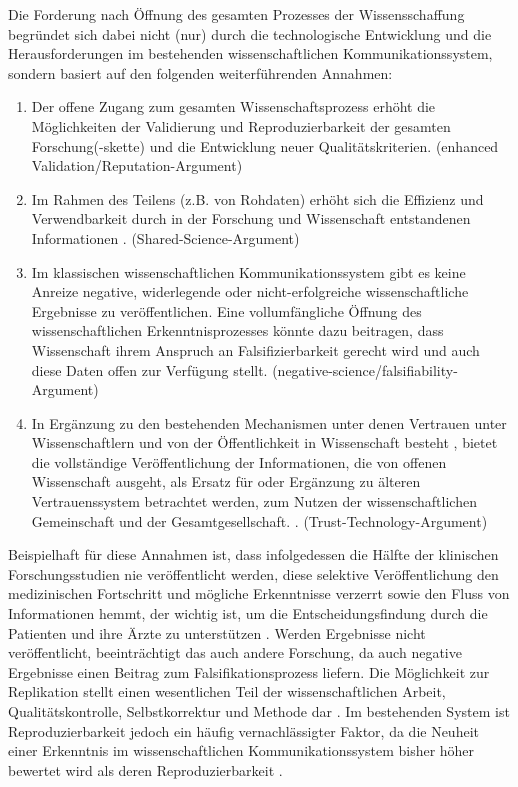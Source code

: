 Die Forderung nach Öffnung des gesamten Prozesses der Wissensschaffung begründet sich dabei nicht (nur) durch die technologische Entwicklung und die Herausforderungen im bestehenden wissenschaftlichen Kommunikationssystem, sondern basiert auf den folgenden weiterführenden Annahmen:
\begin{enumerate}
\item Der offene Zugang zum gesamten Wissenschaftsprozess erhöht die Möglichkeiten der Validierung und Reproduzierbarkeit der gesamten Forschung(-skette) \cite{Nosek_2015} \cite{Aleksic_2014} \cite{Krumholz_2014} \cite{hey_2015_open} und die Entwicklung neuer Qualitätskriterien. (enhanced Validation/Reputation-Argument)
\item Im Rahmen des Teilens (z.B. von Rohdaten) erhöht sich die Effizienz und Verwendbarkeit durch in der Forschung und Wissenschaft entstandenen Informationen \cite{Fecher_2015}. (Shared-Science-Argument)
\item Im klassischen wissenschaftlichen Kommunikationssystem gibt es keine Anreize negative, widerlegende oder nicht-erfolgreiche wissenschaftliche Ergebnisse zu veröffentlichen. Eine vollumfängliche Öffnung des wissenschaftlichen Erkenntnisprozesses könnte dazu beitragen, dass Wissenschaft ihrem Anspruch an Falsifizierbarkeit gerecht wird und auch diese Daten offen zur Verfügung stellt. (negative-science/falsifiability-Argument)
\item In Ergänzung zu den bestehenden Mechanismen unter denen Vertrauen unter Wissenschaftlern und von der Öffentlichkeit in Wissenschaft besteht \cite{weingart_2005_wissenschaft}, bietet die vollständige Veröffentlichung der Informationen, die von offenen Wissenschaft ausgeht, als Ersatz für oder Ergänzung zu älteren Vertrauenssystem betrachtet werden, zum Nutzen der wissenschaftlichen Gemeinschaft und der Gesamtgesellschaft. \cite{grand_2012_open}. (Trust-Technology-Argument)
\end{enumerate}

Beispielhaft für diese Annahmen ist, dass infolgedessen die Hälfte der klinischen Forschungsstudien nie veröffentlicht werden, diese selektive Veröffentlichung den medizinischen Fortschritt und mögliche Erkenntnisse verzerrt sowie den Fluss von Informationen hemmt, der wichtig ist, um die Entscheidungsfindung durch die Patienten und ihre Ärzte zu unterstützen \cite{Ross_2013}. Werden Ergebnisse nicht veröffentlicht, beeinträchtigt das auch andere Forschung, da auch negative Ergebnisse einen Beitrag zum Falsifikationsprozess liefern. Die Möglichkeit zur Replikation stellt einen wesentlichen Teil der wissenschaftlichen Arbeit, Qualitätskontrolle, Selbstkorrektur und Methode dar \cite{Nosek_2015}. Im bestehenden System ist Reproduzierbarkeit jedoch ein häufig vernachlässigter Faktor, da die Neuheit einer Erkenntnis im wissenschaftlichen Kommunikationssystem bisher höher bewertet wird als deren Reproduzierbarkeit \cite{Nosek_2015}.

